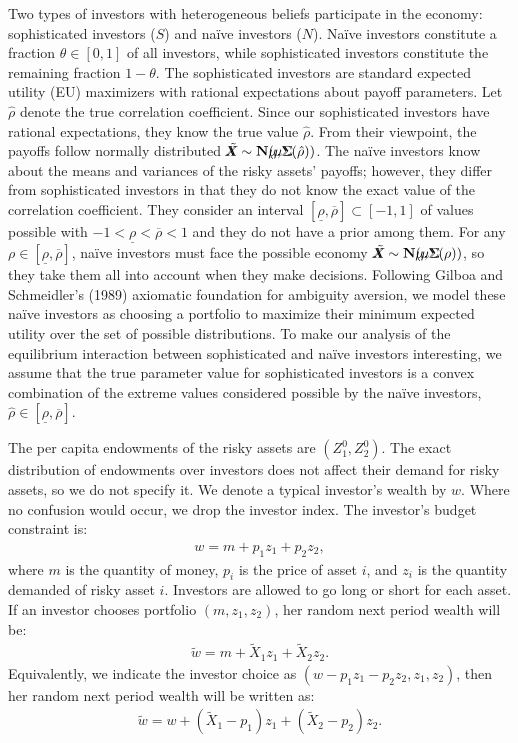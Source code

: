 \documentclass[10pt]{article}
\begin{document}
Two types of investors with heterogeneous beliefs participate in the economy: sophisticated investors ($S$) and na\"ive investors ($N$). Na\"ive investors constitute a fraction $ \theta \in [0, 1] $ of all investors, while sophisticated investors constitute the remaining fraction $ 1 - \theta $. The sophisticated investors are standard expected utility (EU) maximizers with rational expectations about payoff parameters. Let $ \hat \rho $ denote the true correlation coefficient. Since our sophisticated investors have rational expectations, they know the true value $ \hat \rho $. From their viewpoint, the payoffs follow normally distributed $ \tilde X \!\!\!\!\!\! X \sim {\bf N} (\mu \!\!\!\!\!\! \mu, \Sigma \!\!\!\!\! \Sigma (\hat \rho)) $. The na\"ive investors know about the means and variances of the risky assets' payoffs; however, they differ from sophisticated investors in that they do not know the exact value of the correlation coefficient. They consider an interval $ [\underline{\rho}, \overline{\rho}] \subset [- 1, 1] $ of values possible with $ - 1 < \underline{\rho} < \overline{\rho} < 1 $ and they do not have a prior among them. For any $ \rho \in [\underline{\rho}, \overline{\rho}] $, na\"ive investors must face the possible economy $ \tilde X \!\!\!\!\!\! X \sim {\bf N} (\mu \!\!\!\!\!\! \mu, \Sigma \!\!\!\!\! \Sigma (\rho)) $, so they take them all into account when they make decisions. Following Gilboa and Schmeidler's (1989) axiomatic foundation for ambiguity aversion, we model these na\"ive investors as choosing a portfolio to maximize their minimum expected utility over the set of possible distributions. To make our analysis of the equilibrium interaction between sophisticated and na\"ive investors interesting, we assume that the true parameter value for sophisticated investors is a convex combination of the extreme values considered possible by the na\"ive investors, $ \hat \rho \in [\underline{\rho}, \overline{\rho}] $.

The per capita endowments of the risky assets are $ (Z^0_1, Z^0_2) $. The exact distribution of endowments over investors does not affect their demand for risky assets, so we do not specify it. We denote a typical investor's wealth by $w$. Where no confusion would occur, we drop the investor index. The investor's budget constraint is:
\begin{eqnarray}
w = m + p_1 z_1 + p_2 z_2,
\end{eqnarray}
where $m$ is the quantity of money, $ p_i $ is the price of asset $i$, and $ z_i $ is the quantity demanded of risky asset $i$. Investors are allowed to go long or short for each asset. If an investor chooses portfolio $ (m, z_1, z_2) $, her random next period wealth will be:
\begin{eqnarray}
\tilde w = m + \tilde X_1 z_1 + \tilde X_2 z_2.
\end{eqnarray}
Equivalently, we indicate the investor choice as $ (w - p_1 z_1 - p_2 z_2, z_1, z_2) $, then her random next period wealth will be written as:
\begin{eqnarray*}
\tilde{w}  = w + (\tilde{X}_1 - p_1) z_1 + (\tilde{X}_2 - p_2) z_2.
\end{eqnarray*}
\end{document}

